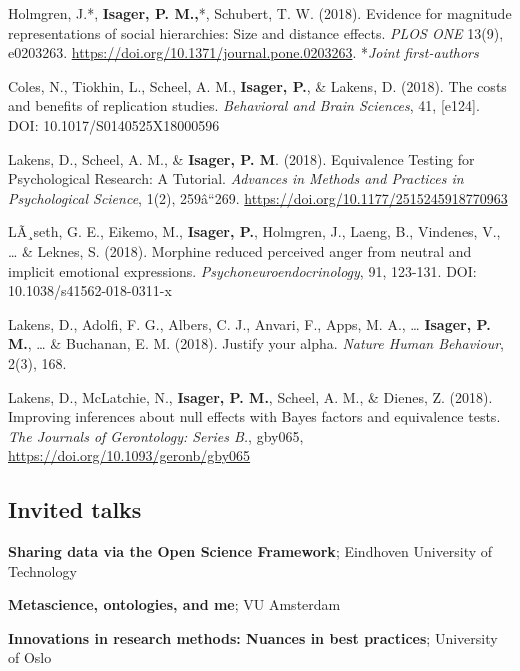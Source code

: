 \documentclass[]{article}
\providecommand{\tightlist}{%
  \setlength{\itemsep}{0pt}\setlength{\parskip}{0pt}}
\begin{document}
Holmgren, J.*, \textbf{Isager, P. M.,}*, Schubert, T. W. (2018).
Evidence for magnitude representations of social hierarchies: Size and
distance effects. \emph{PLOS ONE} 13(9), e0203263.
\url{https://doi.org/10.1371/journal.pone.0203263}. *\emph{Joint
first-authors}

Coles, N., Tiokhin, L., Scheel, A. M., \textbf{Isager, P.}, \& Lakens,
D. (2018). The costs and benefits of replication studies.
\emph{Behavioral and Brain Sciences}, 41, {[}e124{]}. DOI:
10.1017/S0140525X18000596

Lakens, D., Scheel, A. M., \& \textbf{Isager, P. M}. (2018). Equivalence
Testing for Psychological Research: A Tutorial. \emph{Advances in
Methods and Practices in Psychological Science}, 1(2), 259â``269.
\url{https://doi.org/10.1177/2515245918770963}

LÃ¸seth, G. E., Eikemo, M., \textbf{Isager, P.}, Holmgren, J., Laeng,
B., Vindenes, V., \ldots{} \& Leknes, S. (2018). Morphine reduced
perceived anger from neutral and implicit emotional expressions.
\emph{Psychoneuroendocrinology}, 91, 123-131. DOI:
10.1038/s41562-018-0311-x

Lakens, D., Adolfi, F. G., Albers, C. J., Anvari, F., Apps, M. A.,
\ldots{} \textbf{Isager, P. M.}, \ldots{} \& Buchanan, E. M. (2018).
Justify your alpha. \emph{Nature Human Behaviour}, 2(3), 168.

Lakens, D., McLatchie, N., \textbf{Isager, P. M.}, Scheel, A. M., \&
Dienes, Z. (2018). Improving inferences about null effects with Bayes
factors and equivalence tests. \emph{The Journals of Gerontology: Series
B.}, gby065, \url{https://doi.org/10.1093/geronb/gby065}

\subsection{Invited talks}\label{invited-talks}

\begin{description}
\tightlist
\item[2019]
\textbf{Sharing data via the Open Science Framework}; Eindhoven
University of Technology\\
\item[2018]
\textbf{Metascience, ontologies, and me}; VU Amsterdam\\
\item[2018]
\textbf{Innovations in research methods: Nuances in best practices};
University of Oslo
\end{description}
\end{document}
